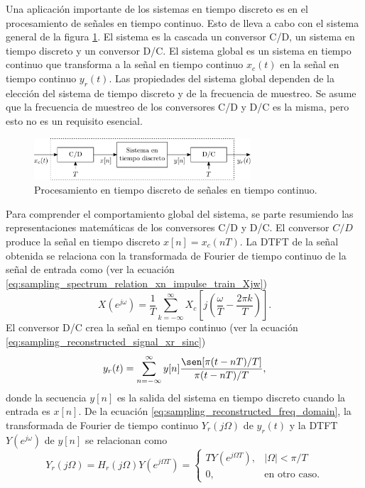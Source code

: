 \documentclass[a4paper]{report}
\begin{document}
Una aplicación importante de los sistemas en tiempo discreto es en el procesamiento de señales en tiempo continuo. Esto de lleva a cabo con el sistema general de la figura \ref{fig:sampling_discrete_processing_continuous_signal_block_diagram}. El sistema es la cascada un conversor C/D, un sistema en tiempo discreto y un conversor D/C. El sistema global es un sistema en tiempo continuo que transforma a la señal en tiempo continuo \(x_c(t)\) en la señal en tiempo continuo \(y_r(t)\). Las propiedades del sistema global dependen de la elección del sistema de tiempo discreto y de la frecuencia de muestreo. Se asume que la frecuencia de muestreo de los conversores C/D y D/C es la misma, pero esto no es un requisito esencial.
\begin{figure}[!htb]
 \begin{center}
 \includegraphics[width=0.72\textwidth]{figuras/sampling_discrete_processing_continuous_signal_block_diagram.pdf}
 \caption{\label{fig:sampling_discrete_processing_continuous_signal_block_diagram} Procesamiento en tiempo discreto de señales en tiempo continuo.}
 \end{center}
\end{figure} 

Para comprender el comportamiento global del sistema, se parte resumiendo las representaciones matemáticas de los conversores C/D y D/C. El conversor \(C/D\) produce la señal en tiempo discreto \(x[n]=x_c(nT)\). La DTFT de la señal obtenida se relaciona con la transformada de Fourier de tiempo continuo de la señal de entrada como (ver la ecuación \ref{eq:sampling_spectrum_relation_xn_impulse_train_Xjw})
\begin{equation}\label{eq:sampling_cd_conversion_freq_relation}
 X(e^{j\omega})=\frac{1}{T}\sum_{k=-\infty}^{\infty}X_c\left[j\left(\frac{\omega}{T}-\frac{2\pi k}{T}\right)\right]. 
\end{equation}
El conversor D/C crea la señal en tiempo continuo (ver la ecuación \ref{eq:sampling_reconstructed_signal_xr_sinc})
\[
 y_r(t)=\sum_{n=-\infty}^\infty y[n]\frac{\sen[\pi(t-nT)/T]}{\pi(t-nT)/T},
\]
donde la secuencia \(y[n]\) es la salida del sistema en tiempo discreto cuando la entrada es \(x[n]\). De la ecuación \ref{eq:sampling_reconstructed_freq_domain}, la transformada de Fourier de tiempo continuo \(Y_r(j\Omega)\) de \(y_r(t)\) y la DTFT \(Y(e^{j\omega})\) de \(y[n]\) se relacionan como
\begin{equation}\label{eq:sampling_dc_conversion_freq_relation}
 Y_r(j\Omega)=H_r(j\Omega)Y(e^{j\Omega T})
 =\left\{
  \begin{array}{ll}
   TY(e^{j\Omega T}), & |\Omega|<\pi/T\\
   0, & \textrm{en otro caso}.
  \end{array}
  \right.
\end{equation}
\end{document}
